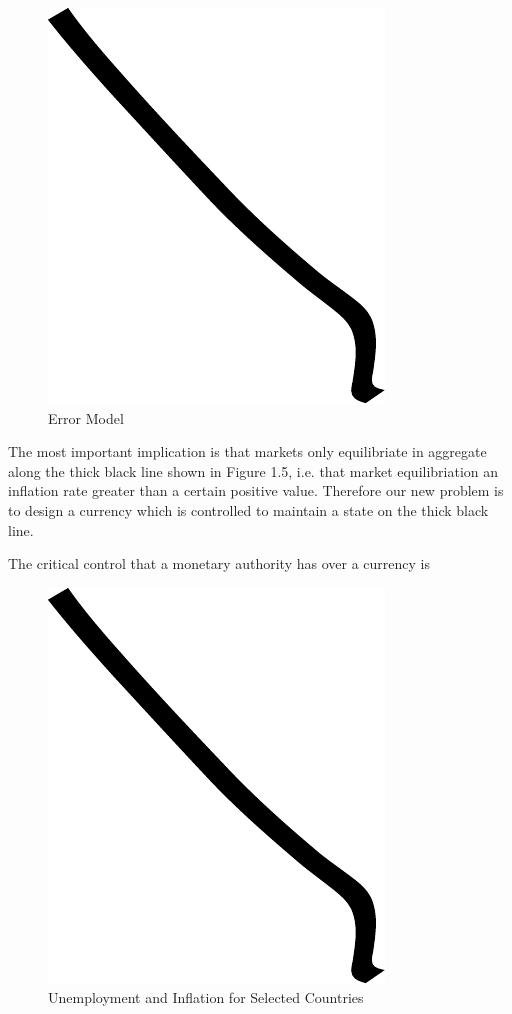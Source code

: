 \begin{figure}
\centering
\includegraphics{img/example.pdf}
\caption{Error Model}
\end{figure}

The most important implication is that markets only equilibriate in aggregate along the thick black
line shown in Figure 1.5, i.e. that market equilibriation an inflation rate greater than a certain
positive value. Therefore our new problem is to design a currency which is controlled to maintain a
state on the thick black line.

The critical control that a monetary authority has over a currency is

\begin{figure}
\centering
\includegraphics{img/example.pdf}
\caption{Unemployment and Inflation for Selected Countries}
\end{figure}


